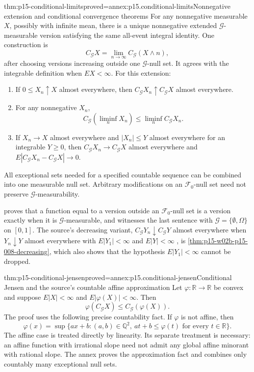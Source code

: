 \begin{hbtheorem}{thm:p15-conditional-limits}{proved=annex:p15.conditional-limits}{Nonnegative extension and conditional convergence theorems}
For any nonnegative measurable \(X\), possibly with infinite mean,
there is a unique nonnegative extended \(\mathcal G\)-measurable version
satisfying the same all-event integral identity. One construction is
\[
                   C_{\mathcal G}X=\lim_{n\to\infty}C_{\mathcal G}(X\wedge n),
\]
after choosing versions increasing outside one \(\mathcal G\)-null set.
It agrees with the integrable definition when \(EX<\infty\).
For this extension:
\begin{enumerate}
\item If \(0\leq X_n\uparrow X\) almost everywhere, then
      \(C_{\mathcal G}X_n\uparrow C_{\mathcal G}X\) almost everywhere.
\item For any nonnegative \(X_n\),
      \[
       C_{\mathcal G}(\liminf_n X_n)\leq\liminf_n C_{\mathcal G}X_n.
      \]
\item If \(X_n\to X\) almost everywhere and \(|X_n|\leq Y\) almost
      everywhere for an integrable \(Y\geq0\), then
      \(C_{\mathcal G}X_n\to C_{\mathcal G}X\) almost everywhere and
      \(E|C_{\mathcal G}X_n-C_{\mathcal G}X|\to0\).
\end{enumerate}
All exceptional sets needed for a specified countable sequence can be
combined into one measurable null set. Arbitrary modifications on an
\(\mathcal F_0\)-null set need not preserve \(\mathcal G\)-measurability.
\end{hbtheorem}

 proves that a function
equal to a version outside an \(\mathcal F_0\)-null set is a version
exactly when it is \(\mathcal G\)-measurable, and witnesses the last
sentence with \(\mathcal G=\{\emptyset,\Omega\}\) on \([0,1]\).
The source's decreasing variant, \(C_{\mathcal G}Y_n\downarrow
C_{\mathcal G}Y\) almost everywhere when \(Y_n\downarrow Y\) almost
everywhere with \(E|Y_1|<\infty\) and \(E|Y|<\infty\)
\cite[p.~210]{DurrettPTEAuthor2019}, is
\cref{thm:p15-w02b-p15-008-decreasing}, which also shows that the
hypothesis \(E|Y_1|<\infty\) cannot be dropped.

\begin{hbtheorem}{thm:p15-conditional-jensen}{proved=annex:p15.conditional-jensen}{Conditional Jensen and the source's countable affine approximation}
Let \(\varphi:\mathbb R\to\mathbb R\) be convex and suppose
\(E|X|<\infty\) and \(E|\varphi(X)|<\infty\). Then
\[
                   \varphi(C_{\mathcal G}X)
                          \leq C_{\mathcal G}(\varphi(X)).
\]
The proof uses the following precise countability fact. If \(\varphi\)
is not affine, then
\[
 \varphi(x)=\sup\{ax+b:(a,b)\in\mathbb Q^2,\ 
                           at+b\leq\varphi(t)\text{ for every }t\in\mathbb R\}.
\]
The affine case is treated directly by linearity. Its separate treatment
is necessary: an affine function with irrational slope need not admit
any global affine minorant with rational slope.
The annex proves the approximation fact and combines only countably
many exceptional null sets.
\end{hbtheorem}

